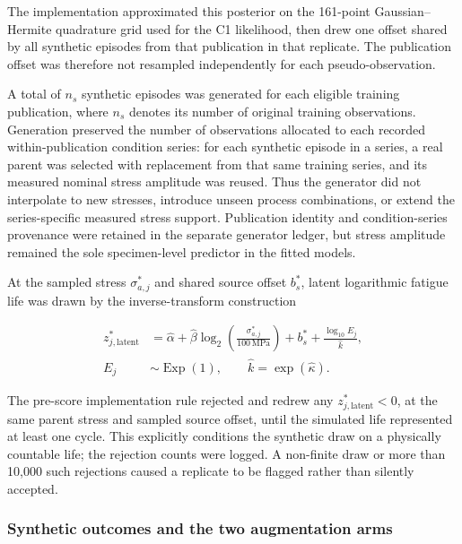 \documentclass[12pt,a4paper]{article}
\begin{document}
The implementation approximated this posterior on the 161-point Gaussian–Hermite quadrature grid used for the C1 likelihood, then drew one offset shared by all synthetic episodes from that publication in that replicate. The publication offset was therefore not resampled independently for each pseudo-observation.

A total of \(n_s\) synthetic episodes was generated for each eligible training publication, where \(n_s\) denotes its number of original training observations. Generation preserved the number of observations allocated to each recorded within-publication condition series: for each synthetic episode in a series, a real parent was selected with replacement from that same training series, and its measured nominal stress amplitude was reused. Thus the generator did not interpolate to new stresses, introduce unseen process combinations, or extend the series-specific measured stress support. Publication identity and condition-series provenance were retained in the separate generator ledger, but stress amplitude remained the sole specimen-level predictor in the fitted models.

At the sampled stress \(\sigma_{a,j}^{*}\) and shared source offset \(b_s^{*}\), latent logarithmic fatigue life was drawn by the inverse-transform construction

\begin{equation}
\begin{aligned}
z_{j,\mathrm{latent}}^{*}
&= \widehat{\alpha}
 +\widehat{\beta}\log_2\!\left(\frac{\sigma_{a,j}^{*}}{100\,\mathrm{MPa}}\right)
 +b_s^{*}
 +\frac{\log_{10}E_j}{\widehat{k}},\\
E_j&\sim\operatorname{Exp}(1),\qquad
\widehat{k}=\exp(\widehat{\kappa}).
\end{aligned}
\tag{2.5b}
\end{equation}

The pre-score implementation rule rejected and redrew any \(z_{j,\mathrm{latent}}^{*}<0\), at the same parent stress and sampled source offset, until the simulated life represented at least one cycle. This explicitly conditions the synthetic draw on a physically countable life; the rejection counts were logged. A non-finite draw or more than 10,000 such rejections caused a replicate to be flagged rather than silently accepted.

\subsubsection{Synthetic outcomes and the two augmentation arms}
\end{document}
